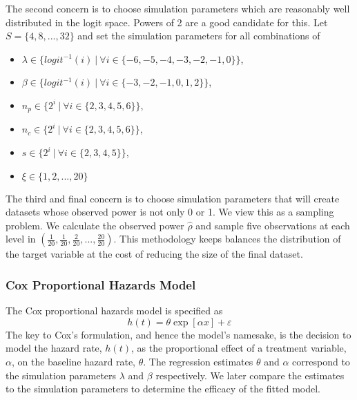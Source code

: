 The second concern is to choose simulation parameters which are reasonably well distributed in the logit space. Powers of 2 are a good candidate for this. Let $S = \lbrace 4, 8, ..., 32 \rbrace$ and set the simulation parameters for all combinations of

\begin{itemize}
    \item $\lambda \in \lbrace logit^{-1}(i) ~|~ \forall i \in \lbrace -6, -5, -4, -3, -2, -1, 0 \rbrace \rbrace$,
    \item $\beta \in \lbrace logit^{-1}(i) ~|~ \forall i \in \lbrace -3, -2, -1, 0, 1, 2 \rbrace \rbrace$,
    \item $n_p \in \lbrace 2^i ~|~ \forall i \in \lbrace 2, 3, 4, 5, 6 \rbrace \rbrace$, 
    \item $n_c \in \lbrace 2^i ~|~ \forall i \in \lbrace 2, 3, 4, 5, 6 \rbrace \rbrace$, 
    \item $s \in \lbrace 2^i ~|~ \forall i \in \lbrace 2, 3, 4, 5 \rbrace \rbrace$,
    \item $\xi \in \lbrace 1, 2, ..., 20 \rbrace$
\end{itemize}

The third and final concern is to choose simulation parameters that will create datasets whose observed power is not only 0 or 1. We view this as a sampling problem. We calculate the observed power $\hat \rho$ and sample five observations at each level in $(\frac{1}{20}, \frac{1}{20}, \frac{2}{20}, ..., \frac{20}{20})$. This methodology keeps balances the distribution of the target variable at the cost of reducing the size of the final dataset.

\subsubsection{Cox Proportional Hazards Model}

The Cox proportional hazards model is specified as 
%
\begin{equation}
\label{eq:cox}
    h(t) = \theta \exp \left[ \alpha x \right] + \varepsilon
\end{equation}
%
The key to Cox's formulation, and hence the model's namesake, is the decision to model the hazard rate, $h(t)$, as the proportional effect of a treatment variable, $\alpha$, on the baseline hazard rate, $\theta$. The regression estimates $\theta$ and $\alpha$ correspond to the simulation parameters $\lambda$ and $\beta$ respectively. We later compare the estimates to the simulation parameters to determine the efficacy of the fitted model.

